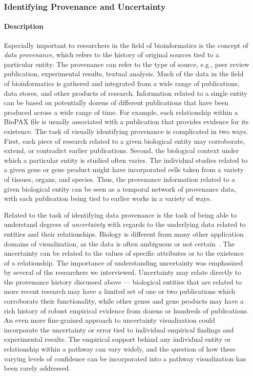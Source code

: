 \documentclass[twocolumn]{bmcart}%
\begin{document}


\subsubsection*{Identifying Provenance and Uncertainty}

\paragraph*{Description}

Especially important to researchers in the field of bioinformatics is the concept of \textit{data provenance}, which refers to the history of original sources tied to a particular entity.
The provenance can refer to the type of source, e.g., peer review publication, experimental results, textual analysis.
Much of the data in the field of bioinformatics is gathered and integrated from a wide range of publications, data stores, and other products of research.
Information related to a single entity can be based on potentially dozens of different publications that have been produced across a wide range of time.
For example, each relationship within a BioPAX file is usually associated with a publication that provides evidence for its existence.
The task of visually identifying provenance is complicated in two ways.
First, each piece of research related to a given biological entity may corroborate, extend, or contradict earlier publications.
Second, the biological context under which a particular entity is studied often varies.
The individual studies related to a given gene or gene product might have incorporated cells taken from a variety of tissues, organs, and species.
Thus, the provenance information related to a given biological entity can be seen as a temporal network of provenance data, with each publication being tied to earlier works in a variety of ways.

Related to the task of identifying data provenance is the task of being able to understand degrees of \textit{uncertainty} with regards to the underlying data related to entities and their relationships.
Biology is different from many other application domains of visualization, as the data is often ambiguous or not certain~\cite{kohlbacher2014multivariate}.
The uncertainty can be related to the values of specific attributes or to the existence of a relationship.
The importance of understanding uncertainty was emphasized by several of the researchers we interviewed.
Uncertainty may relate directly to the provenance history discussed above --- biological entities that are related to more recent research may have a limited set of one or two publications which corroborate their functionality, while other genes and gene products may have a rich history of robust empirical evidence from dozens or hundreds of publications.
An even more fine-grained approach to uncertainty visualization could incorporate the uncertainty or error tied to individual empirical findings and experimental results.
The empirical support behind any individual entity or relationship within a pathway can vary widely, and the question of how these varying levels of confidence can be incorporated into a pathway visualization has been rarely addressed.
\end{document}
